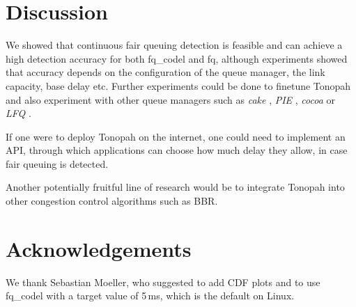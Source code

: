 \documentclass[conference]{IEEEtran}
\begin{document}
\section{Discussion}

We showed that continuous fair queuing detection is feasible and can achieve a high detection accuracy for both fq\_codel and fq, although experiments showed that accuracy depends on the configuration of the queue manager, 
the link capacity, base delay etc. Further experiments could be done to finetune Tonopah and also experiment with other queue managers such as \textit{cake} \cite{hoiland-jorgensen_piece_2018}, \textit{PIE} \cite{pan_pie_2013}, \textit{cocoa} \cite{bachl_cocoa_2019} or \textit{LFQ} \cite{bachl_lfq_2020}. 

If one were to deploy Tonopah on the internet, one could need to implement an API, through which applications can choose how much delay they allow, in case fair queuing is detected. 

Another potentially fruitful line of research would be to integrate Tonopah into other congestion control algorithms such as BBR. 

\section*{Acknowledgements}

We thank Sebastian Moeller, who suggested to add CDF plots and to use fq\_codel with a target value of 5\,ms, which is the default on Linux. 



\end{document}
